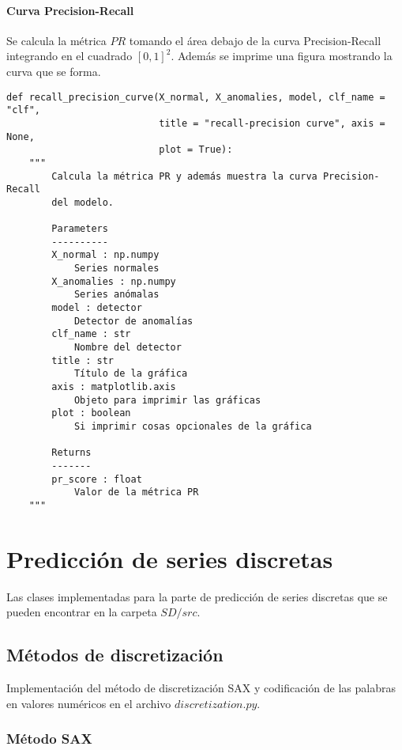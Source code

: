 \paragraph{Curva Precision-Recall}

Se calcula la métrica $PR$ tomando el área debajo de la curva Precision-Recall integrando en el cuadrado $[0, 1]^2$. Además se imprime una figura mostrando la curva que se forma.

\begin{lstlisting}
def recall_precision_curve(X_normal, X_anomalies, model, clf_name = "clf",
                           title = "recall-precision curve", axis = None,
                           plot = True):
    """
        Calcula la métrica PR y además muestra la curva Precision-Recall
        del modelo.

        Parameters
        ----------
        X_normal : np.numpy
            Series normales
        X_anomalies : np.numpy
            Series anómalas
        model : detector
            Detector de anomalías
        clf_name : str
            Nombre del detector
        title : str
            Título de la gráfica
        axis : matplotlib.axis
            Objeto para imprimir las gráficas
        plot : boolean
            Si imprimir cosas opcionales de la gráfica

        Returns
        -------
        pr_score : float
            Valor de la métrica PR
    """
\end{lstlisting}

\section{Predicción de series discretas}

Las clases implementadas para la parte de predicción de series discretas que se pueden encontrar en la carpeta $SD/src$.

\subsection{Métodos de discretización}

Implementación del método de discretización SAX y codificación de las palabras en valores numéricos en el archivo $discretization.py$.

\subsubsection{Método SAX}

